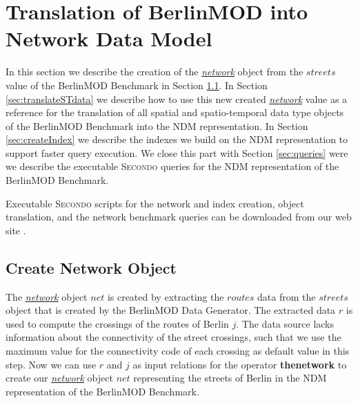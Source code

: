 \documentclass[a4paper]{article}
\newcommand{\secondo}{\textsc{Secondo}}
\newcommand{\bmodb} {BerlinMOD Benchmark}
\newcommand{\op}[1]{\textbf{#1}}
\newcommand{\dt}[1]{\textsl{\underline{#1}}}
\begin{document}
\section{Translation of BerlinMOD into Network Data Model}
\label{sec:Translation}
In this section we describe the creation of the \dt{network} object from the $streets$
value of the \bmodb{} in Section \ref{sec:createNetwork}. In Section
\ref{sec:translateSTdata} we describe how to use this new created \dt{network}
value as a reference for the translation of all spatial and spatio-temporal data
type objects of the \bmodb{} into the NDM representation.
In Section \ref{sec:createIndex} we describe the indexes we build on the NDM
representation to support faster query execution. We close this part
with Section \ref{sec:queries} were we describe the executable \secondo{} queries
for the NDM representation of the \bmodb{}.

Executable \secondo{} scripts for the network and index creation, object translation,
and the network benchmark queries can be downloaded from our web site \cite{NetworkWeb}.
\subsection{Create Network Object}
\label{sec:createNetwork}
The \dt{network} object $net$ is created by extracting the $routes$ data from
the $streets$ object that is created by the BerlinMOD Data Generator.
The extracted data $r$ is used to compute the crossings of the
routes of Berlin $j$. The data source lacks information about the connectivity
of the street crossings, such that we use the maximum value for the connectivity
code of each crossing as default value in this step.
Now we can use $r$ and $j$ as input relations for the operator \op{thenetwork}
to create our \dt{network} object $net$ representing the streets of Berlin in
the NDM representation of the \bmodb{}.
\end{document}
